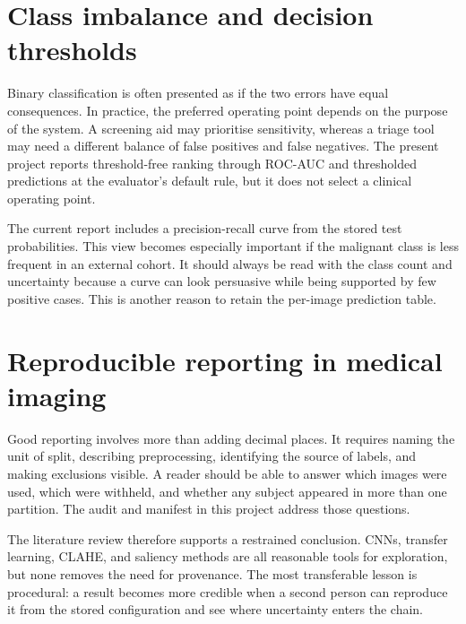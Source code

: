 \section{Class imbalance and decision thresholds}
Binary classification is often presented as if the two errors have equal consequences. In practice, the preferred operating point depends on the purpose of the system. A screening aid may prioritise sensitivity, whereas a triage tool may need a different balance of false positives and false negatives. The present project reports threshold-free ranking through ROC-AUC and thresholded predictions at the evaluator's default rule, but it does not select a clinical operating point.

The current report includes a precision-recall curve from the stored test probabilities. This view becomes especially important if the malignant class is less frequent in an external cohort. It should always be read with the class count and uncertainty because a curve can look persuasive while being supported by few positive cases. This is another reason to retain the per-image prediction table.

\section{Reproducible reporting in medical imaging}
Good reporting involves more than adding decimal places. It requires naming the unit of split, describing preprocessing, identifying the source of labels, and making exclusions visible. A reader should be able to answer which images were used, which were withheld, and whether any subject appeared in more than one partition. The audit and manifest in this project address those questions.

The literature review therefore supports a restrained conclusion. CNNs, transfer learning, CLAHE, and saliency methods are all reasonable tools for exploration, but none removes the need for provenance. The most transferable lesson is procedural: a result becomes more credible when a second person can reproduce it from the stored configuration and see where uncertainty enters the chain.

